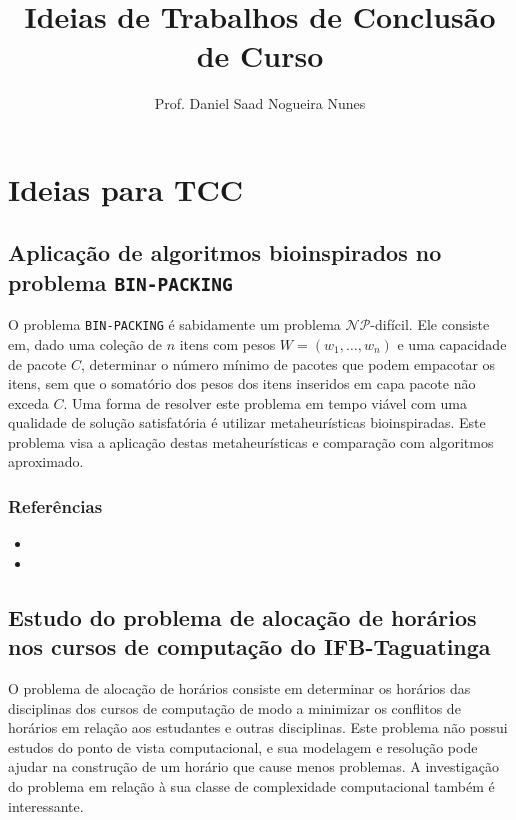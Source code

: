 \documentclass{article}
\author{Prof. Daniel Saad Nogueira Nunes}
\title{Ideias de Trabalhos de Conclusão de Curso}
\date{}
\newcommand*{\nsubsection}[1]{
    \subsection*{#1}
}
\begin{document}
\maketitle
\setcounter{tocdepth}{2}
\setcounter{secnumdepth}{2}
\tableofcontents
{}	


\newpage


\section{Ideias para TCC}


\nsubsection{Aplicação de algoritmos bioinspirados no problema {\tt BIN-PACKING}}

O problema {\tt BIN-PACKING} é sabidamente um problema $\mathcal{N\!P}$-difícil. Ele consiste em, dado uma coleção de $n$ itens com pesos $W=(w_1,\ldots,w_n)$ e uma capacidade de pacote $C$, determinar o número mínimo de pacotes que podem empacotar os itens, sem que o somatório dos pesos dos itens inseridos em capa pacote não exceda $C$. Uma forma de resolver este problema em tempo viável com uma qualidade de solução satisfatória é utilizar metaheurísticas bioinspiradas. Este problema visa a aplicação destas metaheurísticas e comparação com algoritmos aproximado.


\subsubsection*{Referências}

\begin{itemize}
	\item {}
	\item {}
\end{itemize}



\nsubsection{Estudo do problema de alocação de horários nos cursos de computação do IFB-Taguatinga}

O problema de alocação de horários consiste em determinar os horários das disciplinas dos cursos de computação de modo a minimizar os conflitos de horários em relação aos estudantes e outras disciplinas. Este problema não possui estudos do ponto de vista computacional, e sua modelagem e resolução pode ajudar na construção de um horário que cause menos problemas. A investigação do problema em relação à sua classe de complexidade computacional também é interessante. 
\end{document}
